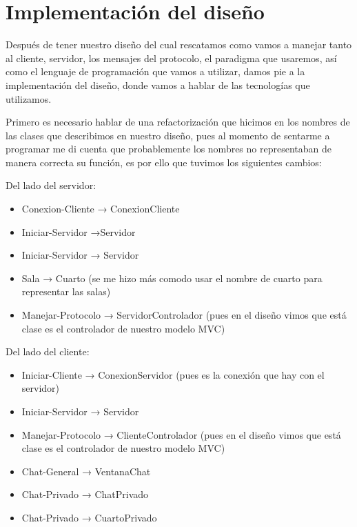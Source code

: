 \documentclass[10pt,letterpaper]{report}
\begin{document}
    \chapter{Implementación del diseño}

    \noindent Después de tener nuestro diseño del cual rescatamos como vamos a manejar tanto al cliente, servidor, los mensajes del protocolo, el paradigma que usaremos, así como el lenguaje de programación que vamos a utilizar, damos pie a la implementación del diseño, donde vamos a hablar de las tecnologías que utilizamos.

    \noindent Primero es necesario hablar de una refactorización que hicimos en los nombres de las clases que describimos en nuestro diseño, pues al momento de sentarme a programar me di cuenta que probablemente los nombres no representaban de manera correcta su función, es por ello que tuvimos los siguientes cambios:

    \vspace{0.2cm}

    Del lado del servidor:

    \begin{itemize}
        \item[-] Conexion-Cliente → ConexionCliente
        \item [-] Iniciar-Servidor →Servidor
        \item [-] Iniciar-Servidor → Servidor
        \item [-] Sala → Cuarto (se me hizo más comodo usar el nombre de cuarto para representar las salas)
        \item [-] Manejar-Protocolo → ServidorControlador (pues en el diseño vimos que está clase es el controlador de nuestro modelo MVC)
    \end{itemize}

    Del lado del cliente:

    \begin{itemize}
        \item[-] Iniciar-Cliente → ConexionServidor (pues es la conexión que hay con el servidor)
        \item [-] Iniciar-Servidor → Servidor
        \item [-] Manejar-Protocolo → ClienteControlador (pues en el diseño vimos que está clase es el controlador de nuestro modelo MVC)
        \item [-] Chat-General → VentanaChat
        \item [-] Chat-Privado → ChatPrivado
        \item [-] Chat-Privado → CuartoPrivado

    \end{itemize}
\end{document}
